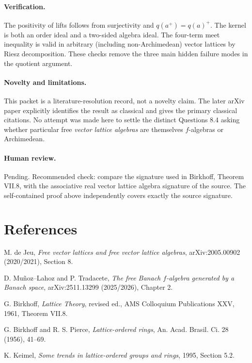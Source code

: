\documentclass[11pt]{article}
\begin{document}
\paragraph{Verification.}
The positivity of lifts follows from surjectivity and
\(q(a^+)=q(a)^+\).  The kernel is both an order ideal and a two-sided algebra
ideal.  The four-term meet inequality is valid in arbitrary (including
non-Archimedean) vector lattices by Riesz decomposition.  These checks remove
the three main hidden failure modes in the quotient argument.

\paragraph{Novelty and limitations.}
This packet is a literature-resolution record, not a novelty claim.  The later
arXiv paper explicitly identifies the result as classical and gives the
primary classical citations.  No attempt was made here to settle the distinct
Questions 8.4 asking whether particular free \emph{vector lattice algebras}
are themselves \(f\)-algebras or Archimedean.

\paragraph{Human review.}
Pending.  Recommended check: compare the signature used in Birkhoff,
Theorem VII.8, with the associative real vector lattice algebra signature of
the source.  The self-contained proof above independently covers exactly the
source signature.

\section*{References}
\begin{enumerate}[label={[\arabic*]}]
\item M. de Jeu, \emph{Free vector lattices and free vector lattice
algebras}, arXiv:2005.00902 (2020/2021), Section 8.
\item D. Mu\~noz--Lahoz and P. Tradacete, \emph{The free Banach
\(f\)-algebra generated by a Banach space}, arXiv:2511.13299 (2025/2026),
Chapter 2.
\item G. Birkhoff, \emph{Lattice Theory}, revised ed., AMS Colloquium
Publications XXV, 1961, Theorem VII.8.
\item G. Birkhoff and R. S. Pierce, \emph{Lattice-ordered rings}, An. Acad.
Brasil. Ci. 28 (1956), 41--69.
\item K. Keimel, \emph{Some trends in lattice-ordered groups and rings},
1995, Section 5.2.
\end{enumerate}
\end{document}
